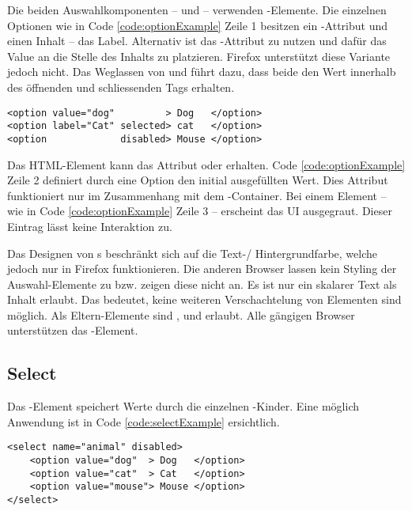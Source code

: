 Die beiden Auswahlkomponenten –  und  – verwenden -Elemente. 
Die einzelnen Optionen wie in Code \ref{code:optionExample} Zeile 1 besitzen ein -Attribut und einen Inhalt – das Label. 
Alternativ ist das -Attribut zu nutzen und dafür das Value an die Stelle des Inhalts zu platzieren. 
Firefox unterstützt diese Variante jedoch nicht. 
Das Weglassen von  und  führt dazu, dass beide den Wert innerhalb des öffnenden und schliessenden Tags erhalten. 

\begin{lstlisting}[style = htmlcssjs, caption = Option Beispiel, label = code:optionExample]
<option value="dog"         > Dog   </option>
<option label="Cat" selected> cat   </option>
<option             disabled> Mouse </option>
\end{lstlisting} 

Das HTML-Element kann das Attribut  oder  erhalten. 
Code \ref{code:optionExample} Zeile 2 definiert durch eine  Option den initial ausgefüllten Wert. 
Dies Attribut funktioniert nur im Zusammenhang mit dem -Container. 
Bei einem  Element – wie in Code \ref{code:optionExample} Zeile 3 – erscheint das UI ausgegraut. 
Dieser Eintrag lässt keine Interaktion zu. 

Das Designen von s beschränkt sich auf die Text-/ Hintergrundfarbe, welche jedoch nur in Firefox funktionieren. 
Die anderen Browser lassen kein Styling der Auswahl-Elemente zu bzw. zeigen diese nicht an. 
Es ist nur ein skalarer Text als Inhalt erlaubt. 
Das bedeutet, keine weiteren Verschachtelung von Elementen sind möglich. 
Als Eltern-Elemente sind ,  und  erlaubt. 
Alle gängigen Browser unterstützen das -Element. 


\subsection{Select}
\label{sec:select}

Das -Element speichert Werte durch die einzelnen -Kinder. 
Eine möglich Anwendung ist in Code \ref{code:selectExample} ersichtlich. 

\begin{lstlisting}[style = htmlcssjs, caption = Disabled Select Beispiel, label = code:selectExample]
<select name="animal" disabled>
    <option value="dog"  > Dog   </option>
    <option value="cat"  > Cat   </option>
    <option value="mouse"> Mouse </option>
</select>
\end{lstlisting}

